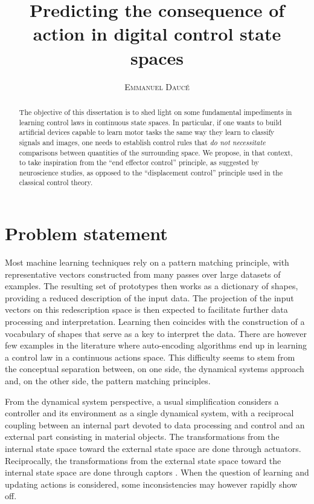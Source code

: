 \documentclass[11pt]{article}
\title{\Huge \textbf{Predicting the consequence of action in digital control state spaces} }
\author{\textsc{Emmanuel Daucé}}%
\begin{document}
\maketitle
\begin{abstract}




The objective  of this dissertation is to shed light on some fundamental impediments 
in learning control laws in continuous state spaces. 
In particular, if one wants to build artificial devices capable to learn motor tasks
the same way they learn to classify signals and images, 
one needs to establish control rules that \textit{do not necessitate} comparisons between quantities
of the surrounding space.
We propose, in that context, to
take inspiration from the ``end effector control'' principle, as suggested by neuroscience studies,  
as opposed to the ``displacement control'' principle used in the classical control theory. 

\end{abstract}

\section{Problem statement}


Most machine learning techniques rely on a pattern matching principle, with representative vectors constructed from many passes over large datasets of examples.
The resulting set of prototypes then works as a dictionary of shapes, providing a reduced description of the input data. The projection of the input vectors on this redescription space is then expected to facilitate further data processing and interpretation.
Learning then coincides with the construction of a vocabulary of shapes that serve as a key to interpret the data. 
There are however few examples in the literature where auto-encoding algorithms end up in learning a control law in a continuous actions space.  
This difficulty seems to stem from the conceptual separation between, on one side, the dynamical systems approach and, on the other side, the pattern matching principles.

From the dynamical system perspective, a usual simplification considers a controller and its environment as a single dynamical system, with a reciprocal coupling between an internal part devoted to data processing and control and an external part consisting in material objects. The transformations from the internal state space toward the external state space are done through actuators. Reciprocally, the transformations from the external state space toward the internal state space are done through captors . 
When  the question of learning and updating actions is considered, some inconsistencies may however rapidly show off. 
\end{document}

